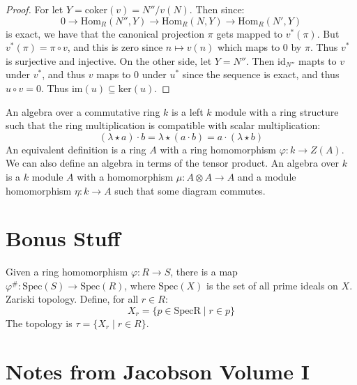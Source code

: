 \documentclass{article}                                                        %
\begin{document}
        \begin{proof}
            For let $Y=\textrm{coker}(v)=N''/v(N)$. Then since:
            \begin{equation}
                0\rightarrow\textrm{Hom}_{R}(N'',Y)
                \rightarrow\textrm{Hom}_{R}(N,Y)
                \rightarrow\textrm{Hom}_{R}(N',Y)
            \end{equation}
            is exact, we have that the canonical projection $\pi$ gets mapped
            to $v^{*}(\pi)$. But $v^{*}(\pi)=\pi\circ{v}$, and this is zero
            since $n\mapsto{v}(n)$ which maps to $0$ by $\pi$. Thus $v^{*}$ is
            surjective and injective. On the other side, let $Y=N''$. Then
            $\textrm{id}_{N''}$ mapts to $v$ under $v^{*}$, and thus
            $v$ maps to $0$ under $u^{*}$ since the sequence is exact, and
            thus $u\circ{v}=0$. Thus $\textrm{im}(u)\subseteq\textrm{ker}(u)$.
        \end{proof}
        An algebra over a commutative ring $k$ is a left $k$ module with a ring
        structure such that the ring multiplication is compatible with scalar
        multiplication:
        \begin{equation}
            (\lambda\star{a})\cdot{b}=\lambda\star(a\cdot{b})
                =a\cdot(\lambda\star{b})
        \end{equation}
        An equivalent definition is a ring $A$ with a ring homomorphism
        $\varphi:k\rightarrow{Z}(A)$. We can also define an algebra in terms of
        the tensor product. An algebra over $k$ is a $k$ module $A$ with a
        homomorphism $\mu:A\otimes{A}\rightarrow{A}$ and a module homomorphism
        $\eta:k\rightarrow{A}$ such that some diagram commutes.
    \section{Bonus Stuff}
        Given a ring homomorphism $\varphi:R\rightarrow{S}$, there is a map
        $\varphi^{\#}:\textrm{Spec}(S)\rightarrow\textrm{Spec}(R)$, where
        $\textrm{Spec}(X)$ is the set of all prime ideals on $X$.
        Zariski topology. Define, for all $r\in{R}$:
        \begin{equation}
            X_{r}=\{p\in\textrm{Spec{R}}\;|\;r\in{p}\}
        \end{equation}
        The topology is $\tau=\{X_{r}\;|\;r\in{R}\}$.
    \section{Notes from Jacobson Volume I}
\end{document}
